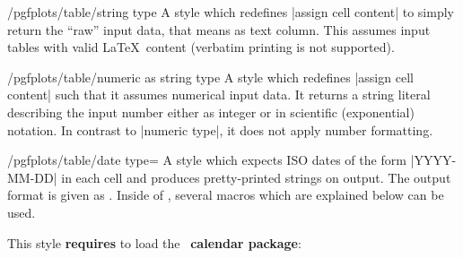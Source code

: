 \begin{stylekey}{/pgfplots/table/string type}
	A style which redefines |assign cell content| to simply return the ``raw'' input data, that means as text column. This assumes input tables with valid \LaTeX\ content (verbatim printing is not supported).
\end{stylekey}

\begin{stylekey}{/pgfplots/table/numeric as string type}
	A style which redefines |assign cell content| such that it assumes numerical input data. It returns a string literal describing the input number either as integer or in scientific (exponential) notation. In contrast to |numeric type|, it does not apply number formatting.
\end{stylekey}

\begin{stylekey}{/pgfplots/table/date type=}%
	A style which expects ISO dates of the form |YYYY-MM-DD| in each cell and produces pretty-printed strings on output. The output format is given as . Inside of , several macros which are explained below can be used.
\begin{codeexample}[]

%

\hspace{1cm}
\end{codeexample}
	This style \textbf{requires} to load the \PGF\  \textbf{calendar package}:
\begin{codeexample}
\usepackage{pgfcalendar}
\end{codeexample}
\end{stylekey}

